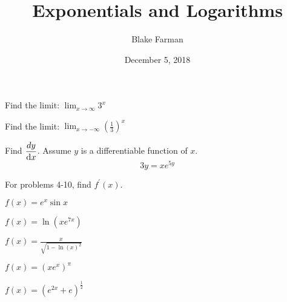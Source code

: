 \documentclass[10pt]{amsart}
\title{Exponentials and Logarithms}
\date{December 5, 2018}
\author{Blake Farman}
\begin{document}
\maketitle

\makenameslot

\begin{thm}
  Find the limit: $\displaystyle{\lim_{x\rightarrow\infty}3^x}$
\end{thm}

\vspace{.5in}

\begin{thm}
  Find the limit: $\displaystyle{\lim_{x\rightarrow-\infty}\left(\frac{1}{3}\right)^x}$
\end{thm}

\vspace{.5in}

\begin{thm}
  Find $\dfrac{dy}{\dif x}$.  Assume $y$ is a differentiable function of $x$. $$3y=xe^{5y}$$
\end{thm}

\vspace{2in}

\newpage

For problems 4-10, find $f^\prime(x)$.\\

\begin{thm}
  $\displaystyle{f(x)=e^x\sin x}$
\end{thm}

\vspace{2in}

\begin{thm}
  $\displaystyle{f(x)=\ln(xe^{7x})}$
\end{thm}

\vspace{2in}

\begin{thm}
  $\displaystyle{f(x)=\frac{x}{\sqrt{1-\ln(x)^2}}}$
\end{thm}

\newpage

\begin{thm}
  $\displaystyle{f(x)=(xe^x)^\pi}$
\end{thm}

\vspace{2in}

\begin{thm}
  $\displaystyle{f(x)=(e^{2x}+e)^{\frac{1}{2}}}$
\end{thm}
\end{document}
